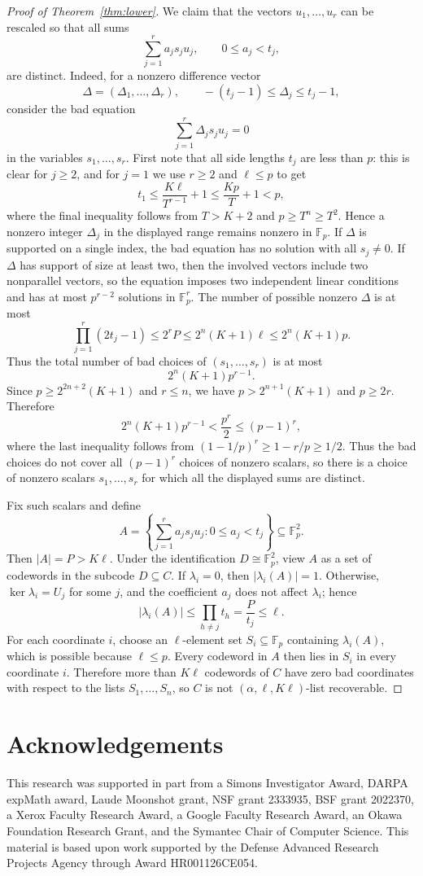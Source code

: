 \documentclass{amsart}
\theoremstyle{definition}
\theoremstyle{remark}
\newcommand{\Fp}{\mathbb{F}_p}
\begin{document}
\begin{proof}[Proof of Theorem~\ref{thm:lower}]
We claim that the vectors $u_1,\ldots,u_r$ can be rescaled so that all sums
\[
\sum_{j=1}^r a_j s_j u_j,
\qquad
0\le a_j<t_j,
\]
are distinct. Indeed, for a nonzero difference vector
\[
\Delta=(\Delta_1,
\ldots,
\Delta_r),
\qquad
-(t_j-1)\le \Delta_j\le t_j-1,
\]
consider the bad equation
\[
\sum_{j=1}^r \Delta_j s_j u_j=0
\]
in the variables $s_1,
\ldots,s_r$. First note that all side lengths $t_j$ are less than $p$: this is clear for $j\ge2$, and for $j=1$ we use $r\ge2$ and $\ell\le p$ to get
\[
t_1\le \frac{K\ell}{T^{r-1}}+1\le \frac{Kp}{T}+1<p,
\]
where the final inequality follows from $T>K+2$ and $p\ge T^n\ge T^2$. Hence a nonzero integer $\Delta_j$ in the displayed range remains nonzero in $\Fp$. If $\Delta$ is supported on a single index, the bad equation has no solution with all $s_j\ne0$. If $\Delta$ has support of size at least two, then the involved vectors include two nonparallel vectors, so the equation imposes two independent linear conditions and has at most $p^{r-2}$ solutions in $\Fp^r$. The number of possible nonzero $\Delta$ is at most
\[
\prod_{j=1}^r (2t_j-1)
\le 2^rP
\le 2^n(K+1)\ell
\le 2^n(K+1)p.
\]
Thus the total number of bad choices of $(s_1,
\ldots,s_r)$ is at most
\[
2^n(K+1)p^{r-1}.
\]
Since $p\ge 2^{2n+2}(K+1)$ and $r\le n$, we have $p>2^{n+1}(K+1)$ and $p\ge2r$. Therefore
\[
2^n(K+1)p^{r-1}<\frac{p^r}{2}\le (p-1)^r,
\]
where the last inequality follows from $(1-1/p)^r\ge 1-r/p\ge 1/2$. Thus the bad choices do not cover all $(p-1)^r$ choices of nonzero scalars, so there is a choice of nonzero scalars $s_1,
\ldots,s_r$ for which all the displayed sums are distinct.

Fix such scalars and define
\[
A=\left\{\sum_{j=1}^r a_js_ju_j:0\le a_j<t_j\right\}\subseteq\Fp^2.
\]
Then $|A|=P>K\ell$. Under the identification $D\cong\Fp^2$, view $A$ as a set of codewords in the subcode $D\subseteq C$. If $\lambda_i=0$, then $|\lambda_i(A)|=1$. Otherwise, $\ker\lambda_i=U_j$ for some $j$, and the coefficient $a_j$ does not affect $\lambda_i$; hence
\[
|\lambda_i(A)|\le \prod_{h\ne j}t_h=\frac{P}{t_j}\le\ell.
\]
For each coordinate $i$, choose an $\ell$-element set $S_i\subseteq\Fp$ containing $\lambda_i(A)$, which is possible because $\ell\le p$. Every codeword in $A$ then lies in $S_i$ in every coordinate $i$. Therefore more than $K\ell$ codewords of $C$ have zero bad coordinates with respect to the lists $S_1,
\ldots,S_n$, so $C$ is not $(\alpha,\ell,K\ell)$-list recoverable.
\end{proof}

\section*{Acknowledgements}
This research was supported in part from a Simons Investigator Award, DARPA expMath award, Laude Moonshot grant, NSF grant 2333935, BSF grant 2022370, a Xerox Faculty Research Award, a Google Faculty Research Award, an Okawa Foundation Research Grant, and the Symantec Chair of Computer Science. This material is based upon work supported by the Defense Advanced Research Projects Agency through Award HR001126CE054.
\end{document}
